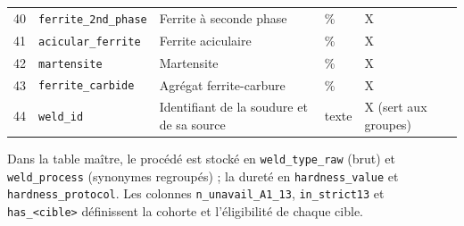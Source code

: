 {\begin{longtable}{@{}r l >{\raggedright\arraybackslash}p{4.7cm} >{\raggedright\arraybackslash}p{2.6cm} >{\raggedright\arraybackslash}p{2.4cm}@{}}
40 & \texttt{ferrite\_2nd\_phase} & Ferrite à seconde phase & \% & X \\
41 & \texttt{acicular\_ferrite} & Ferrite aciculaire & \% & X \\
42 & \texttt{martensite} & Martensite & \% & X \\
43 & \texttt{ferrite\_carbide} & Agrégat ferrite-carbure & \% & X \\
44 & \texttt{weld\_id} & Identifiant de la soudure et de sa source & texte & X (sert aux groupes) \\
\end{longtable}
}

Dans la table maître, le procédé est stocké en \texttt{weld\_type\_raw} (brut)
et \texttt{weld\_process} (synonymes regroupés) ; la dureté en
\texttt{hardness\_value} et \texttt{hardness\_protocol}. Les colonnes
\texttt{n\_unavail\_A1\_13}, \texttt{in\_strict13} et \texttt{has\_<cible>}
définissent la cohorte et l'éligibilité de chaque cible.
